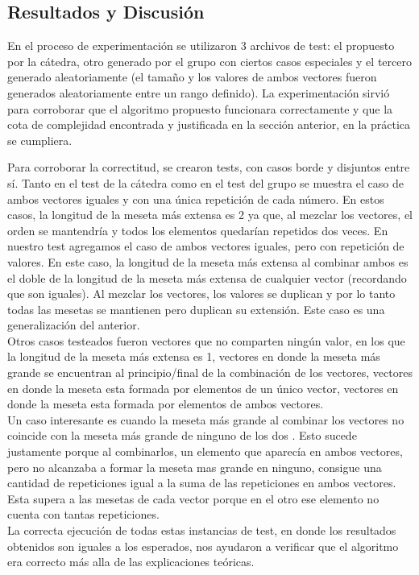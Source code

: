 \documentclass[10pt, a4paper,english,spanish]{article}
\begin{document}
\subsection{Resultados y Discusión}
En el proceso de experimentación se utilizaron 3 archivos de test: el propuesto por la cátedra,
otro generado por el grupo con ciertos casos especiales y el tercero generado aleatoriamente 
(el tamaño y los valores de ambos vectores fueron generados aleatoriamente entre un rango definido). 
La experimentación sirvió para corroborar que el algoritmo propuesto funcionara correctamente y
que la cota de complejidad encontrada y justificada en la sección anterior, en la práctica se cumpliera.

\indent Para corroborar la correctitud, se crearon tests, con casos borde y disjuntos entre sí.
Tanto en el test de la cátedra como en el test del grupo se muestra el caso de ambos vectores iguales 
y con una única repetición de cada número. En estos casos, la longitud de la meseta más extensa es 2 ya que, al
mezclar los vectores, el orden se mantendría y todos los elementos quedarían repetidos dos veces.
En nuestro test agregamos el caso de ambos vectores iguales, pero con repetición de valores.
En este caso, la longitud de la meseta más extensa al combinar ambos es el doble de la 
longitud de la meseta más extensa de cualquier vector (recordando que son iguales). 
Al mezclar los vectores, los valores se duplican y por lo tanto todas las mesetas se mantienen
pero duplican su extensión. Este caso es una generalización del anterior. \\
\indent Otros casos testeados fueron vectores que no comparten ningún valor, en los que la longitud de la meseta
más extensa es 1, vectores en donde la meseta más grande se encuentran al principio/final de la combinación
de los vectores, vectores en donde la meseta esta formada por elementos de un único vector, vectores en donde
la meseta esta formada por elementos de ambos vectores.\\
\indent Un caso interesante es cuando la meseta más grande al combinar los vectores no coincide con la meseta más
grande de ninguno de los dos . Esto sucede justamente porque al combinarlos, un elemento que aparecía
en ambos vectores, pero no alcanzaba a formar la meseta mas grande en ninguno, consigue una cantidad de
repeticiones igual a la suma de las repeticiones en ambos vectores. Esta supera a las mesetas de cada vector
porque en el otro ese elemento no cuenta con tantas repeticiones.\\
\indent La correcta ejecución de todas estas instancias de test, en donde los resultados obtenidos son iguales a
los esperados, nos ayudaron a verificar que el algoritmo era correcto más alla de las explicaciones teóricas.
\end{document}
